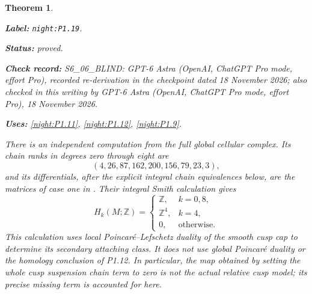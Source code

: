 \documentclass[11pt,a4paper]{article}
\newtheorem{theorem}{Theorem}[section]
\theoremstyle{definition}
\newcommand{\StatementRecord}[4]{\par\smallskip\begingroup\upshape\raggedright\noindent\textbf{Label:} \nolinkurl{#1}.\par\noindent\textbf{Status:} #2.\par\noindent\textbf{Check record:} #3.\par\noindent\textbf{Uses:} #4.\par\endgroup\smallskip}
\newcommand{\CurrentChecker}{GPT-6 Astra (OpenAI, ChatGPT Pro mode, effort Pro), 18 November 2026}
\begin{document}
\begin{theorem}\label{night:P1.19}
\StatementRecord{night:P1.19}{proved}{S6\_06\_BLIND: GPT-6 Astra (OpenAI, ChatGPT Pro mode, effort Pro), recorded re-derivation in the checkpoint dated 18 November 2026; also checked in this writing by \CurrentChecker}{\cref{night:P1.11}, \cref{night:P1.12}, \cref{night:P1.9}}
There is an independent computation from the full global cellular
complex.  Its chain ranks in degrees zero through eight are
\[
 (4,26,87,162,200,156,79,23,3),
\]
and its differentials, after the explicit integral chain equivalences
below, are the matrices of case one in
.
Their integral Smith calculation gives
\[
 H_k(M;\mathbb Z)=
 \begin{cases}
 \mathbb Z,&k=0,8,\\
 \mathbb Z^4,&k=4,\\
 0,&\text{otherwise}.
 \end{cases}
\]
This calculation uses local Poincar\'e--Lefschetz duality of the
smooth cusp cap to determine its secondary attaching class.  It does
not use global Poincar\'e duality or the homology conclusion of P1.12.
In particular, the map obtained by setting the whole cusp suspension
chain term to zero is not the actual relative cusp model; its precise
missing term is accounted for here.
\end{theorem}
\end{document}
